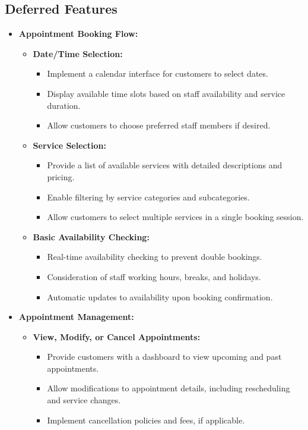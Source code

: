 \subsection{Deferred Features}
\begin{itemize}[leftmargin=*]
    \item \textbf{Appointment Booking Flow:}
    \begin{itemize}
        \item \textbf{Date/Time Selection:}
        \begin{itemize}
            \item Implement a calendar interface for customers to select dates.
            \item Display available time slots based on staff availability and service duration.
            \item Allow customers to choose preferred staff members if desired.
        \end{itemize}
        
        \item \textbf{Service Selection:}
        \begin{itemize}
            \item Provide a list of available services with detailed descriptions and pricing.
            \item Enable filtering by service categories and subcategories.
            \item Allow customers to select multiple services in a single booking session.
        \end{itemize}
        
        \item \textbf{Basic Availability Checking:}
        \begin{itemize}
            \item Real-time availability checking to prevent double bookings.
            \item Consideration of staff working hours, breaks, and holidays.
            \item Automatic updates to availability upon booking confirmation.
        \end{itemize}
    \end{itemize}
    
    \item \textbf{Appointment Management:}
    \begin{itemize}
        \item \textbf{View, Modify, or Cancel Appointments:}
        \begin{itemize}
            \item Provide customers with a dashboard to view upcoming and past appointments.
            \item Allow modifications to appointment details, including rescheduling and service changes.
            \item Implement cancellation policies and fees, if applicable.
        \end{itemize}
        

\end{itemize}
\end{itemize}

